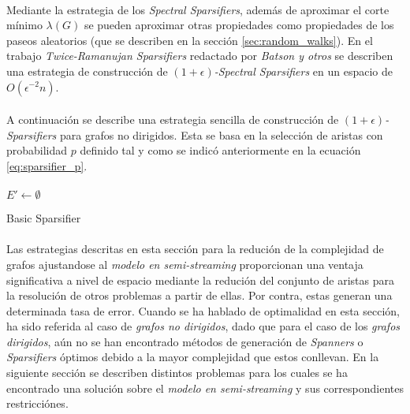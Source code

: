 \documentclass{subfiles}
\begin{document}
        \paragraph{}
        Mediante la estrategia de los \emph{Spectral Sparsifiers}, además de aproximar el corte mínimo $\lambda(G)$ se pueden aproximar otras propiedades como propiedades de los paseos aleatorios (que se describen en la sección \ref{sec:random_walks}). En el trabajo \emph{Twice-Ramanujan Sparsifiers} \cite{batson2012twice} redactado por \emph{Batson y otros} se describen una estrategia de construcción de \emph{$(1 +\epsilon)$-Spectral Sparsifiers} en un espacio de $O(\epsilon^{-2}n)$.

        \paragraph{}
        A continuación se describe una estrategia sencilla de construcción de \emph{$(1 +\epsilon)$-Sparsifiers} para grafos no dirigidos. Esta se basa en la selección de aristas con probabilidad $p$ definido tal y como se indicó anteriormente en la ecuación \eqref{eq:sparsifier_p}.

        \paragraph{}
        \begin{algorithm}
          \SetAlgoLined
          $E' \gets \emptyset$\;
          \caption{Basic Sparsifier}
          \label{code:basic_sparsifier}
        \end{algorithm}

        \paragraph{}
        Las estrategias descritas en esta sección para la redución de la complejidad de grafos ajustandose al \emph{modelo en semi-streaming} proporcionan una ventaja significativa a nivel de espacio mediante la redución del conjunto de aristas para la resolución de otros problemas a partir de ellas. Por contra, estas generan una determinada tasa de error. Cuando se ha hablado de optimalidad en esta sección, ha sido referida al caso de \emph{grafos no dirigidos}, dado que para el caso de los \emph{grafos dirigidos}, aún no se han encontrado métodos de generación de \emph{Spanners} o \emph{Sparsifiers} óptimos debido a la mayor complejidad que estos conllevan. En la siguiente sección se describen distintos problemas para los cuales se ha encontrado una solución sobre el \emph{modelo en semi-streaming} y sus correspondientes restricciónes.
\end{document}
